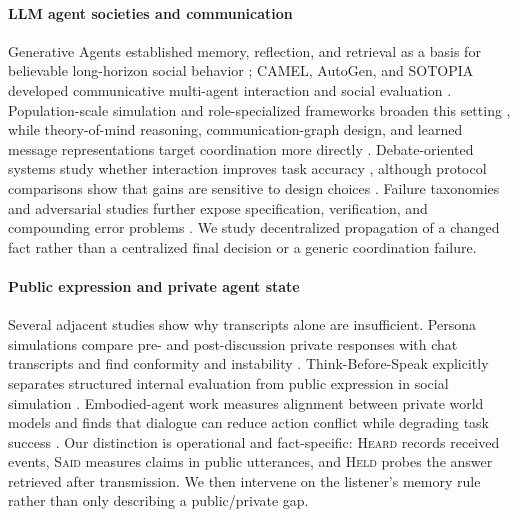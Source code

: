 \documentclass[sigconf,anonymous]{acmart}
\newcommand{\heard}{\textsc{Heard}}
\newcommand{\said}{\textsc{Said}}
\newcommand{\held}{\textsc{Held}}
\begin{document}
\paragraph{LLM agent societies and communication}
Generative Agents established memory, reflection, and retrieval as a basis for believable
long-horizon social behavior \cite{park2023generative}; CAMEL, AutoGen, and SOTOPIA developed
communicative multi-agent interaction and social evaluation
\cite{li2023camel,wu2023autogen,zhou2024sotopia,chen2023agentverse}.  Population-scale simulation
and role-specialized frameworks broaden this setting
\cite{park2024thousand,hong2024metagpt,qian2024chatdev,gao2024agentscope}, while theory-of-mind
reasoning, communication-graph design, and learned message representations target coordination
more directly \cite{li2023theorymind,zhang2025gdesigner,ramesh2025activations}.  Debate-oriented
systems study whether interaction improves task accuracy
\cite{du2023improving,michael2023debate,liang2024encouraging,khan2024debating}, although protocol
comparisons show that gains are sensitive to design choices \cite{smit2024mad}.  Failure
taxonomies and adversarial studies further expose specification, verification, and compounding
error problems \cite{cemri2025mast,gu2024agentsmith,amayuelas2024multiagent,xie2026spark,
jia2026masfire}.  We study decentralized propagation of a changed fact rather than a centralized
final decision or a generic coordination failure.

\paragraph{Public expression and private agent state}
Several adjacent studies show why transcripts alone are insufficient.  Persona simulations compare
pre- and post-discussion private responses with chat transcripts and find conformity and
instability \cite{baltaji2024conformity,weng2025conformity}.  Think-Before-Speak explicitly
separates structured internal evaluation from public expression in social simulation
\cite{yang2026think}.  Embodied-agent work measures alignment between private world models and
finds that dialogue can reduce action conflict while degrading task success
\cite{dongre2026worldmodels}.  Our distinction is operational and fact-specific: \heard{} records
received events, \said{} measures claims in public utterances, and \held{} probes the answer
retrieved after transmission.  We then intervene on the listener's memory rule rather than only
describing a public/private gap.
\end{document}
